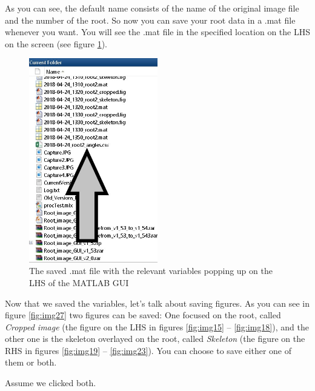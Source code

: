 As you can see, the default name consists of the name of the original image file and the number of the root. 
So now you can save your root data in a .mat file whenever you want. You will see the .mat file in the specified location on the LHS on the screen (see figure \ref{fig:img26}).

\begin{figure}[H]
	\centering
	\includegraphics[width=0.5\textwidth]{../Figures/manual/save3.jpg}
	\caption{The saved .mat file with the relevant variables popping up on the LHS of the MATLAB GUI}
	\label{fig:img26}
\end{figure}

Now that we saved the variables, let's talk about saving figures. As you can see in figure \ref{fig:img27} two figures can be saved: One focused on the root, called \textit{Cropped image} (the figure on the LHS in figures \ref{fig:img15} -- \ref{fig:img18}), and the other one is the skeleton overlayed on the root, called \textit{Skeleton} (the figure on the RHS in figures \ref{fig:img19} -- \ref{fig:img23}).
You can choose to save either one of them or both.

Assume we clicked both.

